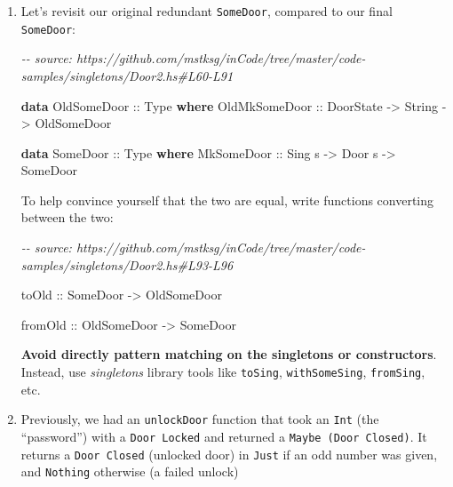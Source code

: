 \documentclass[]{article}
\newenvironment{Shaded}{}{}
\newcommand{\CommentTok}[1]{\textcolor[rgb]{0.38,0.63,0.69}{\textit{#1}}}
\newcommand{\DataTypeTok}[1]{\textcolor[rgb]{0.56,0.13,0.00}{#1}}
\newcommand{\KeywordTok}[1]{\textcolor[rgb]{0.00,0.44,0.13}{\textbf{#1}}}
\newcommand{\NormalTok}[1]{#1}
\newcommand{\OtherTok}[1]{\textcolor[rgb]{0.00,0.44,0.13}{#1}}
\begin{document}
\begin{enumerate}
\def\labelenumi{\arabic{enumi}.}
\item
  Let's revisit our original redundant \texttt{SomeDoor}, compared to our final
  \texttt{SomeDoor}:

\begin{Shaded}
\begin{Highlighting}[]
\CommentTok{{-}{-} source: https://github.com/mstksg/inCode/tree/master/code{-}samples/singletons/Door2.hs\#L60{-}L91}

\KeywordTok{data} \DataTypeTok{OldSomeDoor}\OtherTok{ ::} \DataTypeTok{Type} \KeywordTok{where}
    \DataTypeTok{OldMkSomeDoor}\OtherTok{ ::} \DataTypeTok{DoorState} \OtherTok{{-}>} \DataTypeTok{String} \OtherTok{{-}>} \DataTypeTok{OldSomeDoor}

\KeywordTok{data} \DataTypeTok{SomeDoor}\OtherTok{ ::} \DataTypeTok{Type} \KeywordTok{where}
    \DataTypeTok{MkSomeDoor}\OtherTok{ ::} \DataTypeTok{Sing}\NormalTok{ s }\OtherTok{{-}>} \DataTypeTok{Door}\NormalTok{ s }\OtherTok{{-}>} \DataTypeTok{SomeDoor}
\end{Highlighting}
\end{Shaded}

  To help convince yourself that the two are equal, write functions converting
  between the two:

\begin{Shaded}
\begin{Highlighting}[]
\CommentTok{{-}{-} source: https://github.com/mstksg/inCode/tree/master/code{-}samples/singletons/Door2.hs\#L93{-}L96}

\OtherTok{toOld ::} \DataTypeTok{SomeDoor} \OtherTok{{-}>} \DataTypeTok{OldSomeDoor}

\OtherTok{fromOld ::} \DataTypeTok{OldSomeDoor} \OtherTok{{-}>} \DataTypeTok{SomeDoor}
\end{Highlighting}
\end{Shaded}

  \textbf{Avoid directly pattern matching on the singletons or constructors}.
  Instead, use \emph{singletons} library tools like \texttt{toSing},
  \texttt{withSomeSing}, \texttt{fromSing}, etc.
\item
  Previously, we had an \texttt{unlockDoor} function that took an \texttt{Int}
  (the ``password'') with a \texttt{Door\ \textquotesingle{}Locked} and returned
  a \texttt{Maybe\ (Door\ \textquotesingle{}Closed)}. It returns a
  \texttt{Door\ \textquotesingle{}Closed} (unlocked door) in \texttt{Just} if an
  odd number was given, and \texttt{Nothing} otherwise (a failed unlock)


\end{enumerate}
\end{document}

